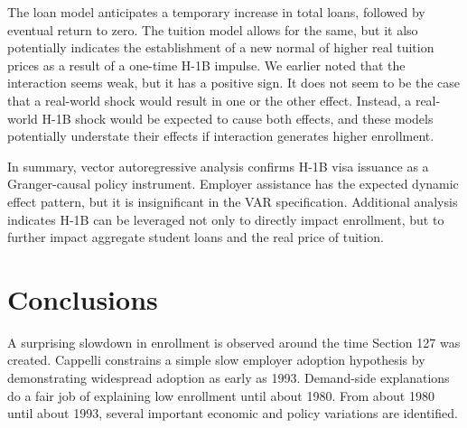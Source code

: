 \documentclass[review]{elsarticle}
\begin{document}
    The loan model anticipates a temporary increase in total loans,
    followed by eventual return to zero.
    The tuition model allows for the same,
    but it also potentially indicates the establishment of a new normal
    of higher real tuition prices as a result of a one-time H-1B impulse.
    We earlier noted that the interaction seems weak, but it has a positive sign.
    It does not seem to be the case that a real-world shock would result in one or the other effect.
    Instead, a real-world H-1B shock would be expected to cause both effects,
    and these models potentially understate their effects if interaction generates higher enrollment.

    In summary, vector autoregressive analysis confirms H-1B visa issuance as a Granger-causal policy instrument.
    Employer assistance has the expected dynamic effect pattern, but it is insignificant in the VAR specification.
    Additional analysis indicates H-1B can be leveraged not only to directly impact enrollment,
    but to further impact aggregate student loans and the real price of tuition.

    \section{Conclusions}

    A surprising slowdown in enrollment is observed around the time Section 127 was created.
    Cappelli constrains a simple slow employer adoption hypothesis by demonstrating widespread adoption as early as 1993.
    Demand-side explanations do a fair job of explaining low enrollment until about 1980.
    From about 1980 until about 1993, several important economic and policy variations are identified.



\end{document}
